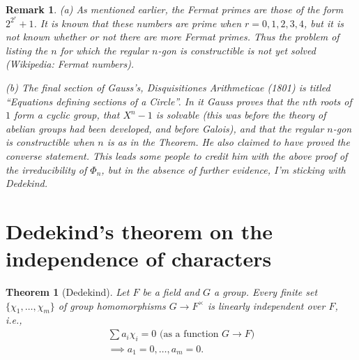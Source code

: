 \documentclass[a4paper,11pt,final,openany]{memoir}
\newtheorem{theorem}[X]{Theorem}
\newtheorem{remark}[X]{Remark}
\theoremstyle{nonumberplain}
\begin{document}
\begin{remark}
\label{ag12}(a) As mentioned earlier, the Fermat primes are those of the form
$2^{2^{r}}+1$. It is known that these numbers are prime when $r=0,1,2,3,4$,
but it is not known whether or not there are more Fermat primes. Thus the
problem of listing the $n$ for which the regular $n$-gon is constructible is
not yet solved (Wikipedia: Fermat numbers).

(b) The final section of Gauss's, \textit{Disquisitiones Arithmeticae}%
\emph{\/} (1801) is titled \textquotedblleft Equations defining sections of a
Circle\textquotedblright. In it Gauss proves that the $n$th roots of $1$ form
a cyclic group, that $X^{n}-1$ is solvable (this was before the theory of
abelian groups had been developed, and before Galois), and that the regular
$n$-gon is constructible when $n$ is as in the Theorem. He also claimed to
have proved the converse statement. This leads some people to credit him with
the above proof of the irreducibility of $\Phi_{n}$, but in the absence of
further evidence, I'm sticking with Dedekind.
\end{remark}

\section{Dedekind's theorem on the independence of characters}

\begin{theorem}
[Dedekind]\label{ag13}%
%
Let $F$ be a field and $G$ a group. Every finite set $\{\chi_{1},\ldots
,\chi_{m}\}$ of group homomorphisms $G\rightarrow F^{\times}$ is linearly
independent over $F$, i.e.,
\begin{align*}
\sum a_{i}\chi_{i}=0\text{\ (as a function }G\rightarrow F)\\
\implies
a_{1}=0,\ldots,a_{m}=0.
\end{align*}

\end{theorem}
\end{document}
